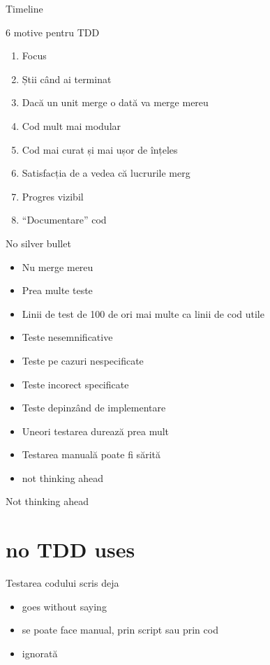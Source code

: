 \documentclass{beamer}
\begin{document}
\begin{frame}{Timeline}
\end{frame}

\begin{frame}{6 motive pentru TDD}
  \begin{enumerate}[<+->]
    \item Focus
    \item Știi când ai terminat
    \item Dacă un unit merge o dată va merge mereu
    \item Cod mult mai modular
    \item Cod mai curat și mai ușor de înțeles
    \item Satisfacția de a vedea că lucrurile merg
    \item Progres vizibil
    \item ``Documentare'' cod
  \end{enumerate}
\end{frame}

\begin{frame}{No silver bullet}
  \begin{itemize}[<+->]
    \item Nu merge mereu
    \item Prea multe teste
    \item Linii de test de 100 de ori mai multe ca linii de cod utile
    \item Teste nesemnificative
    \item Teste pe cazuri nespecificate
    \item Teste incorect specificate
    \item Teste depinzând de implementare
    \item Uneori testarea durează prea mult
    \item Testarea manuală poate fi sărită
    \item not thinking ahead
  \end{itemize}
\end{frame}

\begin{frame}{Not thinking ahead}
\end{frame}

\section{no TDD uses}

\begin{frame}{Testarea codului scris deja}
  \begin{itemize}[<+->]
    \item goes without saying
    \item se poate face manual, prin script sau prin cod
    \item ignorată
  \end{itemize}
\end{frame}
\end{document}

